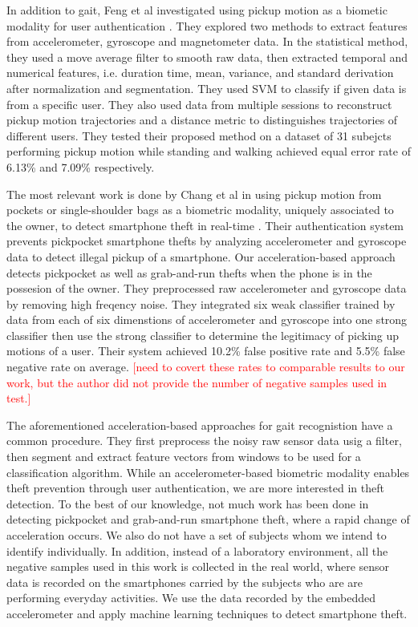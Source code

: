 \documentclass{soups}
\begin{document}
In addition to gait, Feng et al investigated using pickup motion as a biometic modality for user authentication \cite{feng:pickup}. They explored two methods to extract features from accelerometer, gyroscope and magnetometer data. In the statistical method, they used a move average filter to smooth raw data, then extracted temporal and numerical features, i.e. duration time, mean, variance, and standard derivation after normalization and segmentation. They used SVM to classify if given data is from a specific user. They also used data from multiple sessions to reconstruct pickup motion trajectories and a distance metric to distinguishes trajectories of different users. They tested their proposed method on a dataset of 31 subejcts performing pickup motion while standing and walking achieved equal error rate of 6.13\% and 7.09\% respectively.

The most relevant work is done by Chang et al in using pickup motion from pockets or single-shoulder bags as a biometric modality, uniquely associated to the owner, to detect smartphone theft in real-time \cite{cheng:theft}. Their authentication system prevents pickpocket smartphone thefts by analyzing accelerometer and gyroscope data to detect illegal pickup of a smartphone. Our acceleration-based approach detects pickpocket as well as grab-and-run thefts when the phone is in the possesion of the owner. They preprocessed raw accelerometer and gyroscope data by removing high freqency noise. They integrated six weak classifier trained by data from each of six dimenstions of accelerometer and gyroscope into one strong classifier then use the strong classifier to determine the legitimacy of picking up motions of a user. Their system achieved 10.2\% false positive rate and 5.5\% false negative rate on average. \textcolor{red}{ [need to covert these rates to comparable results to our work, but the author did not provide the number of negative samples used in test.]} 

The aforementioned acceleration-based approaches for gait recognistion have a common procedure. They first preprocess the noisy raw sensor data usig a filter, then segment and extract feature vectors from windows to be used for a classification algorithm. While an accelerometer-based biometric modality enables theft prevention through user authentication, we are more interested in theft detection. To the best of our knowledge, not much work has been done in detecting pickpocket and grab-and-run smartphone theft, where a rapid change of acceleration occurs. We also do not have a set of subjects whom we intend to identify individually. In addition, instead of a laboratory environment, all the negative samples used in this work is collected in the real world, where sensor data is recorded on the smartphones carried by the subjects who are are performing everyday activities. We use the data recorded by the embedded accelerometer and apply machine learning techniques to detect smartphone theft.
\end{document}

